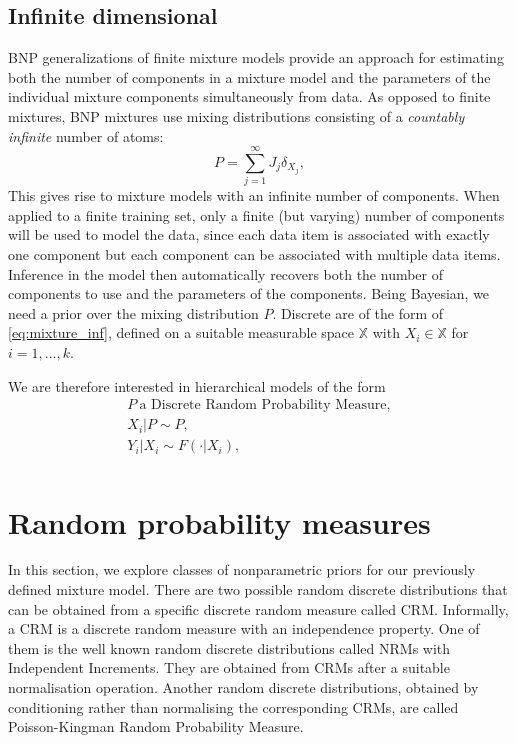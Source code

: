 \subsection{Infinite dimensional}
\acrlong{BNP} generalizations of finite mixture models provide an approach for estimating both the number of components in a mixture model and the parameters of the individual mixture components simultaneously from data. As opposed to finite mixtures, \gls{BNP} mixtures use mixing distributions consisting of a \textit{countably infinite} number of atoms:
\begin{equation} \label{eq:mixture_inf}
P = \sum_{j=1}^\infty J_j \delta_{X_j},
\end{equation}
This gives rise to mixture models with an infinite number of components. When applied to a finite training set, only a finite (but varying) number of components will be used to model the data, since each data item is associated with exactly one component but each component can be associated with multiple data items.
Inference in the model then automatically recovers both the number of components to use and the parameters of the components.
Being Bayesian, we need a prior over the mixing distribution $P$. %
Discrete  are of the form of \ref{eq:mixture_inf}, defined on a suitable measurable space $\mathbb{X}$ with $X_i \in \mathbb{X}$ for $i=1,\dots,k$.


We are therefore interested in hierarchical models of the form
\begin{gather*}
P \ \text{a Discrete Random Probability Measure}, \\
X_i|P \sim P, \\
Y_i|X_i \sim F(\cdot|X_i), \\
\end{gather*}


\section{Random probability measures}
In this section, we explore classes of nonparametric priors for our previously defined mixture model.
There are two possible random discrete distributions that can be obtained from a specific discrete random measure called \acrfull{CRM}. Informally, a \gls{CRM} is a discrete random measure with an independence property. One of them is the well known random discrete distributions called \acrlong{NRM}s with Independent Increments. They are obtained from \glspl{CRM} after a suitable normalisation operation. Another random discrete distributions, obtained by conditioning rather than normalising the corresponding \glspl{CRM}, are called Poisson-Kingman Random Probability Measure.

